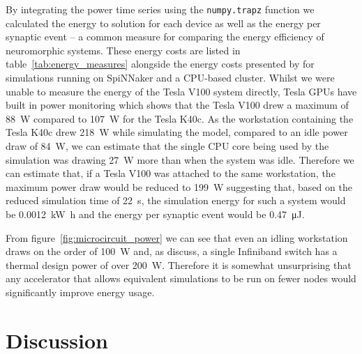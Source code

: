 \documentclass[utf8]{frontiersSCNS} %
\begin{document}
By integrating the power time series using the \lstinline{numpy.trapz} function we calculated the energy to solution for each device as well as the energy per synaptic event -- a common measure for comparing the energy efficiency of neuromorphic systems.
These energy costs are listed in table~\ref{tab:energy_measures} alongside the energy costs presented by \citet{VanAlbada2018} for simulations running on SpiNNaker and a CPU-based cluster.
Whilst we were unable to measure the energy of the Tesla V100 system directly, Tesla GPUs have built in power monitoring which shows that the Tesla V100 drew a maximum of \SI{88}{\watt} compared to \SI{107}{\watt} for the Tesla K40c.
As the workstation containing the Tesla K40c drew \SI{218}{\watt} while simulating the model, compared to an idle power draw of \SI{84}{\watt}, we can estimate that the single CPU core being used by the simulation was drawing \SI{27}{\watt} more than when the system was idle.
Therefore we can estimate that, if a Tesla V100 was attached to the same workstation, the maximum power draw would be reduced to \SI{199}{\watt} suggesting that, based on the reduced simulation time of \SI{22}{\second}, the simulation energy for such a system would be \SI{0.0012}{\kilo\watt\hour} and the energy per synaptic event would be \SI{0.47}{\micro\joule}.

From figure~\ref{fig:microcircuit_power} we can see that even an idling workstation draws on the order of \SI{100}{\watt} and, as \citet{VanAlbada2018} discuss, a single Infiniband switch has a thermal design power of over \SI{200}{\watt}.
Therefore it is somewhat unsurprising that any accelerator that allows equivalent simulations to be run on fewer nodes would significantly improve energy usage.

\section{Discussion}
\end{document}
